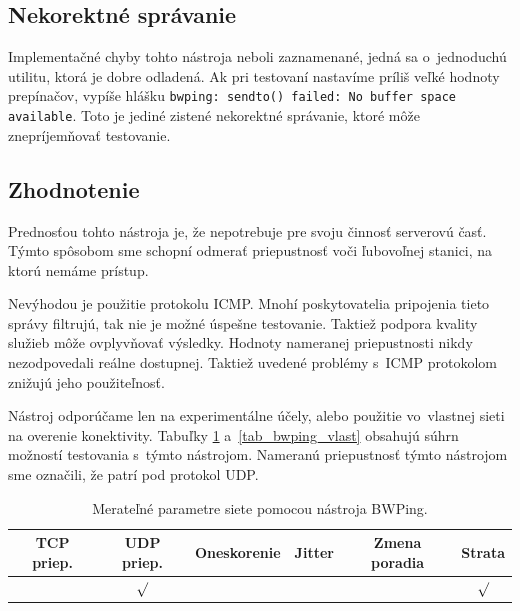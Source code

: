        \subsection{Nekorektné správanie} \label{bwping_chyby}
        Implementačné chyby tohto nástroja neboli zaznamenané,
        jedná sa o~jednoduchú utilitu, ktorá je dobre odladená. 
        Ak pri testovaní nastavíme príliš veľké hodnoty prepínačov, 
        vypíše hlášku 
        \texttt{bwping: sendto() failed: No buffer space available}.
        Toto je jediné zistené nekorektné správanie, ktoré môže 
        znepríjemňovať testovanie.

        \subsection{Zhodnotenie} \label{bwping_zhod}
        Prednosťou tohto nástroja je, že nepotrebuje pre svoju činnosť serverovú
        časť. Týmto spôsobom sme schopní odmerať priepustnosť voči ľubovoľnej
        stanici, na ktorú nemáme prístup. 

        Nevýhodou je použitie protokolu ICMP. Mnohí poskytovatelia pripojenia
        tieto správy filtrujú, tak nie je možné úspešne testovanie. Taktiež
        podpora kvality služieb môže ovplyvňovať výsledky. Hodnoty nameranej 
        priepustnosti nikdy nezodpovedali reálne dostupnej. Taktiež uvedené
        problémy s~ICMP protokolom znižujú jeho použiteľnosť. 
        
        Nástroj
        odporúčame len na experimentálne účely, alebo použitie vo~vlastnej sieti 
        na overenie konektivity. Tabuľky \ref{tab_bwping_param}
        a~\ref{tab_bwping_vlast} obsahujú súhrn možností testovania s~týmto
        nástrojom. Nameranú priepustnosť týmto nástrojom sme označili, že patrí
        pod protokol UDP.

        \begin{table}[H]
            \begin{center}
                \begin{tabular}{|c|c|c|c|c|c|}
                    \hline
                    \textbf{TCP priep.}  &  \textbf{UDP priep.}  &
                    \textbf{Oneskorenie} & \textbf{Jitter} &
                    \textbf{Zmena poradia} & \textbf{Strata} \\
                    \hline
                     & $\surd$ & & & & $\surd$\\ 
                    \hline
                \end{tabular}
                \caption{Merateľné parametre siete pomocou nástroja BWPing.}
                \label{tab_bwping_param}
            \end{center}
        \end{table}

